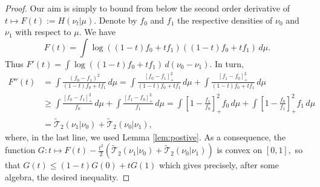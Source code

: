 \documentclass[11pt]{amsart}
\numberwithin{equation}{section}
\begin{document}
\begin{proof}
Our aim is simply to bound from below the second order derivative of $t \mapsto F(t):=H(\nu_t|\mu)$.
Denote by $f_0$ and $f_1$ the respective densities of $\nu_0$ and $\nu_1$ with respect to $\mu$. We have
$$
F(t)=\int \log\left((1-t)f_0+tf_1\right)\left((1-t)f_0+t f_1\right)\,d\mu.
$$
Thus $F'(t)=\int \log\left((1-t)f_0+tf_1\right)\,d(\nu_0-\nu_1)$. In turn,
\begin{align*}
F''(t)
&=
\int \frac{(f_0-f_1)^2}{(1-t)f_0+tf_1}\,d\mu 
=
\int \frac{[f_0-f_1]_+^2}{(1-t)f_0+tf_1}\,d\mu + \int \frac{[f_1-f_0]_+^2}{(1-t)f_0+tf_1}\,d\mu\\
&\geq 
\int \frac{[f_0-f_1]_+^2}{f_0}\,d\mu + \int \frac{[f_1-f_0]_+^2}{f_1}\,d\mu 
 =
\int \left[1-\frac{f_1}{f_0}\right]_+^2 f_0\,d\mu + \int \left[1-\frac{f_0}{f_1}\right]_+^2f_1\,d\mu \\
 & =
{\widetilde{\mathcal{T}}}_2(\nu_1|\nu_0)+{\widetilde{\mathcal{T}}}_2(\nu_0|\nu_1),
\end{align*}
where, in the last line, we used Lemma \ref{lem:postive}.
As a consequence, the function 
$
G \colon t\mapsto F(t)-\frac{t^2}{2}\left({\widetilde{\mathcal{T}}}_2(\nu_1|\nu_0)+{\widetilde{\mathcal{T}}}_2(\nu_0|\nu_1)\right)
$ 
is convex on $[0,1],$ so that $G(t)\leq (1-t)G(0)+tG(1)$ which gives precisely, after some algebra,  the desired inequality.
\end{proof}
\end{document}
